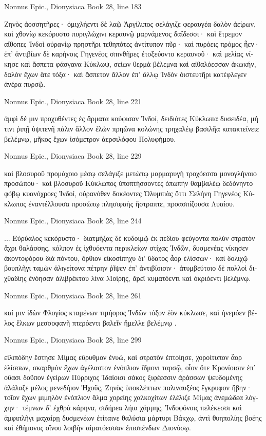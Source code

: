 \documentclass[12pt,letterpaper,twoside,final]{memoir}
\begin{document}
\begin{greek}
Nonnus Epic., Dionysiaca 
Book 28, line 183

Ζηνὸς ἀοσσητῆρες· ὀμιχλήεντι δὲ λαῷ 
Ἀργίλιπος σελάγιζε φεραυγέα δαλὸν ἀείρων, 
καὶ χθονίῳ κεκόρυστο πυριγλώχινι κεραυνῷ 
μαρνάμενος δαΐδεσσι· καὶ ἔτρεμον αἴθοπες Ἰνδοὶ 
οὐρανίῳ πρηστῆρι τεθηπότες ἀντίτυπον πῦρ· 
καὶ πυρόεις πρόμος ἦεν· ἐπ' ἀντιβίων δὲ καρήνοις 
Γηγενέος σπινθῆρες ἐτοξεύοντο κεραυνοῦ· 
καὶ μελίας νίκησε καὶ ἄσπετα φάσγανα Κύκλωψ, 
σείων θερμὰ βέλεμνα καὶ αἰθαλόεσσαν ἀκωκήν, 
δαλὸν ἔχων ἅτε τόξα· καὶ ἄσπετον ἄλλον ἐπ' ἄλλῳ 
Ἰνδὸν ὀιστευτῆρι κατέφλεγεν ἀνέρα πυρσῷ. 



Nonnus Epic., Dionysiaca 
Book 28, line 221

ἀμφὶ δέ μιν προχυθέντες ἐς ἅρματα κούφισαν Ἰνδοί, 
δειδιότες Κύκλωπα δυσειδέα, μή τινι ῥιπῇ 
ὑψιτενῆ πάλιν ἄλλον ἑλὼν πρηῶνα κολώνης 
τρηχαλέῳ βασιλῆα κατακτείνειε βελέμνῳ, 
μῆκος ἔχων ἰσόμετρον ἀερσιλόφου Πολυφήμου. 



Nonnus Epic., Dionysiaca 
Book 28, line 229

καὶ βλοσυροῦ προμάχοιο μέσῳ σελάγιζε μετώπῳ 
μαρμαρυγὴ τροχόεσσα μονογλήνοιο προσώπου· 
καὶ βλοσυροῦ Κύκλωπος ὑποπτήσσοντες ὀπωπὴν 
θαμβαλέῳ δεδόνηντο φόβῳ κυανόχροες Ἰνδοί, 
οὐρανόθεν δοκέοντες Ὀλυμπιὰς ὅττι Σελήνη 
Γηγενέος Κύκλωπος ἐναντέλλουσα προσώπῳ 
πλησιφαὴς ἤστραπτε, προασπίζουσα Λυαίου. 



Nonnus Epic., Dionysiaca 
Book 28, line 244

                                             ... 
Εὐρύαλος κεκόρυστο· διατμήξας δὲ κυδοιμῷ 
ἐκ πεδίου φεύγοντα πολὺν στρατὸν ἄχρι θαλάσσης, 
κόλπον ἐς ἰχθυόεντα περικλείων στίχας Ἰνδῶν, 
δυσμενέας νίκησεν ἀκοντοφόρου διὰ πόντου, 
ὄρθιον εἰκοσίπηχυ δι' ὕδατος ἆορ ἑλίσσων· 
καὶ δολιχῷ βουπλῆγι ταμὼν ἁλιγείτονα πέτρην 
ῥῖψεν ἐπ' ἀντιβίοισιν· ἀτυμβεύτοιο δὲ πολλοὶ 
διχθαδίης ἐνόησαν ἁλιβρέκτου λίνα Μοίρης, 
ἄρεϊ κυματόεντι καὶ ὀκριόεντι βελέμνῳ. 



Nonnus Epic., Dionysiaca 
Book 28, line 261

καί μιν ἰδὼν Φλογίος κταμένων τιμήορος Ἰνδῶν 
τόξον ἑὸν κύκλωσε, καὶ ἠνεμόεν βέλος ἕλκων 
μεσσοφανῆ πτερόεντι βαλεῖν ἤμελλε βελέμνῳ . 



Nonnus Epic., Dionysiaca 
Book 28, line 299

εἱλιπόδην ἔστησε Μίμας εὔρυθμον ἐνυώ, 
καὶ στρατὸν ἐπτοίησε, χοροίτυπον ἆορ ἑλίσσων, 
σκαρθμὸν ἔχων ἀγέλαστον ἐνόπλιον ἴδμονι ταρσῷ,   
οἷον ὅτε Κρονίοισιν ἐπ' οὔασι δοῦπον ἐγείρων 
Πύρριχος Ἰδαίοισι σάκος ξιφέεσσιν ἀράσσων 
ψευδομένης ἀλάλαζε μέλος μενεδήιον Ἠχοῦς, 
Ζηνὸς ὑποκλέπτων παλιναυξέος ἔγκρυφον ἥβην· 
τοῖον ἔχων μιμηλὸν ἐνόπλιον ἅλμα χορείης 
χαλκοχίτων ἐλέλιζε Μίμας ἀνεμώδεα λόγχην· 
τέμνων δ' ἐχθρὰ κάρηνα, σιδήρεα λήια χάρμης, 
Ἰνδοφόνοις πελέκεσσι καὶ ἀμφιπλῆγι μαχαίρῃ 
δυσμενέων ἐτίταινε θαλύσια μάρτυρι Βάκχῳ, 
ἀντὶ θυηπολίης βοέης καὶ ἐθήμονος οἴνου 
λοιβὴν αἱματόεσσαν ἐπισπένδων Διονύσῳ. 




\end{greek}
\end{document}
